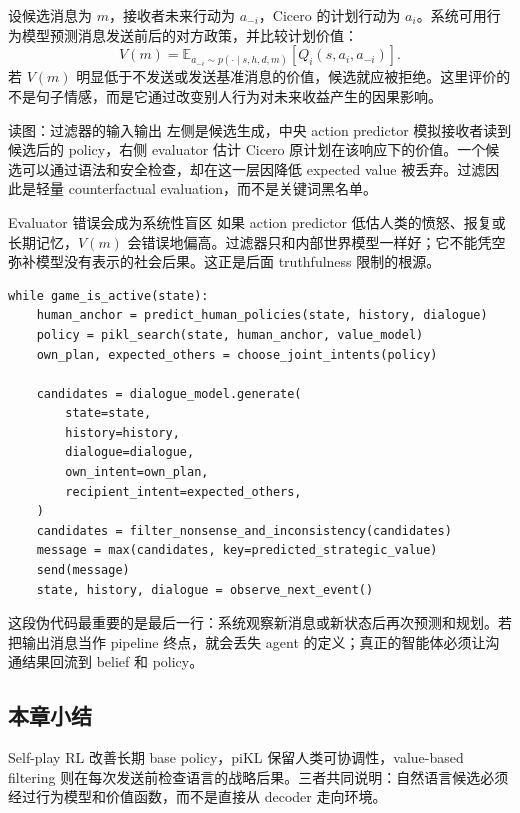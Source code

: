 设候选消息为 $m$，接收者未来行动为 $a_{-i}$，Cicero 的计划行动为 $a_i$。系统可用行为模型预测消息发送前后的对方政策，并比较计划价值：
\begin{equation}
V(m)
=\mathbb{E}_{a_{-i}\sim p(\cdot\mid s,h,d,m)}
\left[Q_i(s,a_i,a_{-i})\right].
\end{equation}
若 $V(m)$ 明显低于不发送或发送基准消息的价值，候选就应被拒绝。这里评价的不是句子情感，而是它通过改变别人行为对未来收益产生的因果影响。


\begin{knowledgebox}{读图：过滤器的输入输出}
左侧是候选生成，中央 action predictor 模拟接收者读到候选后的 policy，右侧 evaluator 估计 Cicero 原计划在该响应下的价值。一个候选可以通过语法和安全检查，却在这一层因降低 expected value 被丢弃。过滤因此是轻量 counterfactual evaluation，而不是关键词黑名单。
\end{knowledgebox}

\begin{warningbox}{Evaluator 错误会成为系统性盲区}
如果 action predictor 低估人类的愤怒、报复或长期记忆，$V(m)$ 会错误地偏高。过滤器只和内部世界模型一样好；它不能凭空弥补模型没有表示的社会后果。这正是后面 truthfulness 限制的根源。
\end{warningbox}

\begin{lstlisting}[caption={Cicero-style strategic dialogue closed loop},label={lst:cicero-loop}]
while game_is_active(state):
    human_anchor = predict_human_policies(state, history, dialogue)
    policy = pikl_search(state, human_anchor, value_model)
    own_plan, expected_others = choose_joint_intents(policy)

    candidates = dialogue_model.generate(
        state=state,
        history=history,
        dialogue=dialogue,
        own_intent=own_plan,
        recipient_intent=expected_others,
    )
    candidates = filter_nonsense_and_inconsistency(candidates)
    message = max(candidates, key=predicted_strategic_value)
    send(message)
    state, history, dialogue = observe_next_event()
\end{lstlisting}

这段伪代码最重要的是最后一行：系统观察新消息或新状态后再次预测和规划。若把输出消息当作 pipeline 终点，就会丢失 agent 的定义；真正的智能体必须让沟通结果回流到 belief 和 policy。

\subsection{本章小结}

Self-play RL 改善长期 base policy，piKL 保留人类可协调性，value-based filtering 则在每次发送前检查语言的战略后果。三者共同说明：自然语言候选必须经过行为模型和价值函数，而不是直接从 decoder 走向环境。


